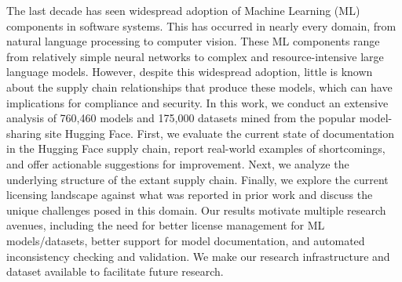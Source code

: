 
The last decade has seen widespread adoption of Machine Learning (ML)
components in software systems. This has occurred in nearly every domain, from natural language processing to computer vision. These ML components range from relatively simple neural networks to complex and resource-intensive large language models.  However, despite this widespread adoption, little is known about the supply chain relationships that produce these models, which can have implications for compliance and security.  In this work, we conduct an extensive analysis of 760,460 models and 175,000 datasets mined from the popular model-sharing site Hugging Face. First, we evaluate the current state of documentation in the Hugging Face supply chain, report real-world examples of shortcomings, and offer actionable suggestions for improvement.  Next, we analyze the underlying structure of the extant supply chain.  Finally, we explore the current licensing landscape against what was reported in prior work and discuss the unique challenges posed in this domain.  Our results motivate multiple research avenues, including the need for better license management for ML models/datasets, better support for model documentation, and automated inconsistency checking and validation.  We make our research infrastructure and dataset available to facilitate future research.
